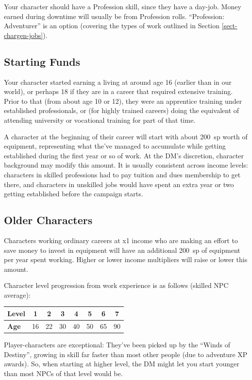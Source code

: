 Your character should have a Profession skill, since they have a day-job.
Money earned during downtime will usually be from Profession rolls.
``Profession: Adventurer'' is an option (covering the types of work outlined
in Section \ref{sect-chargen-jobs}).

%
\subsection{Starting Funds}

Your character started earning a living at around age 16 (earlier than in
our world), or perhaps 18 if they are in a career that required extensive
training. Prior to that (from about age 10 or 12), they were an apprentice
training under established professionals, or (for highly trained careers)
doing the equivalent of attending university or vocational training for
part of that time.

A character at the beginning of their career will start with about 200~sp
worth of equipment, representing what the've managed to accumulate while
getting established during the first year or so of work. At the DM's
discretion, character background may modify this amount. It is usually
consistent across income levels: characters in skilled professions had to
pay tuition and dues membership to get there, and characters in unskilled
jobs would have spent an extra year or two getting established before the
campaign starts.

%
\subsection{Older Characters}

Characters working ordinary careers at x1 income who are making an effort
to save money to invest in equipment will have an additional 200~sp of
equipment per year spent working. Higher or lower income multipliers will
raise or lower this amount.


Character level progression from work experience is as follows (skilled NPC
average):

\begin{tabular}{|l||c|c|c|c|c|c|c|}\hline
\textbf{Level} & 1 & 2 & 3 & 4 & 5 & 6 & 7 \\ \hline
\textbf{Age} & 16 & 22 & 30 & 40 & 50 & 65 & 90 \\ \hline
\end{tabular}

Player-characters are exceptional: They've been picked up by the ``Winds
of Destiny'', growing in skill far faster than most other people (due to
adventure XP awards). So, when starting at higher level, the DM might let
you start younger than most NPCs of that level would be.

%

